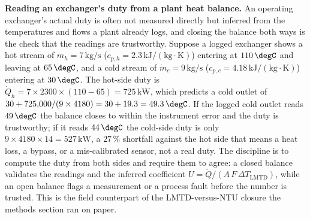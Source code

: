 \textbf{Reading an exchanger's duty from a plant heat balance.} An operating
exchanger's actual duty is often not measured directly but inferred from the
temperatures and flows a plant already logs, and closing the balance both ways is
the check that the readings are trustworthy. Suppose a logged exchanger shows a hot
stream of $\dot{m}_h = 7\,\text{kg/s}$ ($c_{p,h} = 2.3\,\text{kJ}/(\text{kg}\cdot
\si{\kelvin})$) entering at $110\,\degC$ and leaving at $65\,\degC$, and a cold
stream of $\dot{m}_c = 9\,\text{kg/s}$ ($c_{p,c} = 4.18\,\text{kJ}/(\text{kg}\cdot
\si{\kelvin})$) entering at $30\,\degC$. The hot-side duty is $\dot{Q}_h =
7\times 2300\times (110 - 65) = 725\,\text{kW}$, which predicts a cold outlet of
$30 + 725{,}000/(9\times 4180) = 30 + 19.3 = 49.3\,\degC$. If the logged cold
outlet reads $49\,\degC$ the balance closes to within the instrument error and the
duty is trustworthy; if it reads $44\,\degC$ the cold-side duty is only
$9\times 4180\times 14 = 527\,\text{kW}$, a $27\,\%$ shortfall against the hot side
that means a heat loss, a bypass, or a mis-calibrated sensor, not a real duty. The
discipline is to compute the duty from both sides and require them to agree: a
closed balance validates the readings and the inferred coefficient $U = \dot{Q}/
(A\,F\,\Delta T_{\text{LMTD}})$, while an open balance flags a measurement or a
process fault before the number is trusted. This is the field counterpart of the
LMTD-versus-NTU closure the methods section ran on paper.

